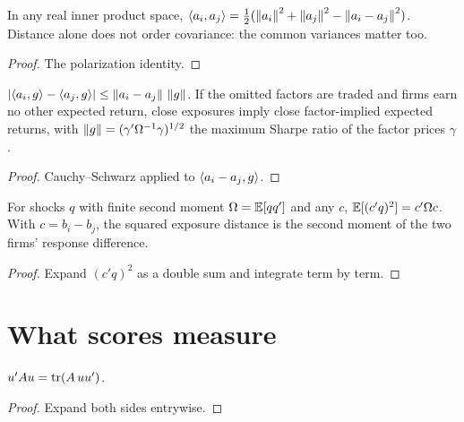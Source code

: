 \begin{lemma}\label{thm:exposure-inner}
  \leanok
  In any real inner product space,
  $\left\langle a_i,a_j\right\rangle=\tfrac12(\left\lVert a_i\right\rVert^2+\left\lVert a_j\right\rVert^2-\left\lVert a_i-a_j\right\rVert^2)$.
  Distance alone does not order covariance: the common variances matter too.
\end{lemma}
\begin{proof}\leanok
  The polarization identity.
\end{proof}

\begin{lemma}\label{thm:exposure-pricing}
  \leanok
  $\left\lvert\left\langle a_i,g\right\rangle-\left\langle a_j,g\right\rangle\right\rvert\le\left\lVert a_i-a_j\right\rVert\,\left\lVert g\right\rVert$.
  If the omitted factors are traded and firms earn no other expected return,
  close exposures imply close factor-implied expected returns, with
  $\left\lVert g\right\rVert=(\gamma'\Omega^{-1}\gamma)^{1/2}$ the maximum Sharpe ratio of the
  factor prices $\gamma$.
\end{lemma}
\begin{proof}\leanok
  Cauchy--Schwarz applied to $\left\langle a_i-a_j,g\right\rangle$.
\end{proof}

\begin{lemma}\label{thm:score-response}
  \leanok
  For shocks $q$ with finite second moment $\Omega=\mathbb{E}[qq']$ and any $c$,
  $\mathbb{E}[(c'q)^2]=c'\Omega c$. With $c=b_i-b_j$, the squared exposure distance is
  the second moment of the two firms' response difference.
\end{lemma}
\begin{proof}\leanok
  Expand $(c'q)^2$ as a double sum and integrate term by term.
\end{proof}

\section{What scores measure}\label{sec:bp-score}

\begin{lemma}\label{thm:score-trace}
  \leanok
  $u'Au=\operatorname{tr}(A\,uu')$.
\end{lemma}
\begin{proof}\leanok
  Expand both sides entrywise.
\end{proof}

